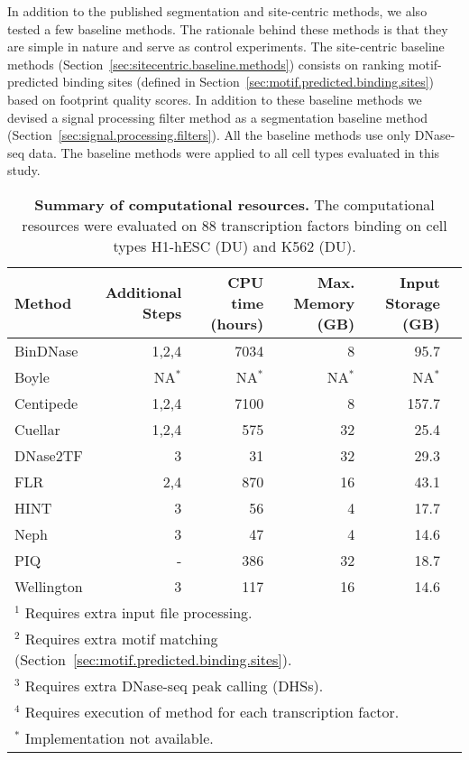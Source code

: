 In addition to the published segmentation and site-centric methods, we also tested a few baseline methods. The rationale behind these methods is that they are simple in nature and serve as control experiments. The site-centric baseline methods (Section~\ref{sec:sitecentric.baseline.methods}) consists on ranking motif-predicted binding sites (defined in Section~\ref{sec:motif.predicted.binding.sites}) based on footprint quality scores. In addition to these baseline methods we devised a signal processing filter method as a segmentation baseline method (Section~\ref{sec:signal.processing.filters}). All the baseline methods use only DNase-seq data. The baseline methods were applied to all cell types evaluated in this study.

\begin{table}[h]
\begin{center}
\caption[Summary of computational resources]{\textbf{Summary of computational resources.} The computational resources were evaluated on 88 transcription factors binding on cell types H1-hESC (DU) and K562 (DU).} 
\label{tab:comp.resource}
\renewcommand{\arraystretch}{1.2}
\begin{tabularx}{\textwidth}{ lrrrrr }
\hline
Method & Additional Steps & CPU time (hours) & Max. Memory (GB) & Input Storage (GB) \\
\hline
BinDNase & 1,2,4 & 7034 & 8 & 95.7 \\
Boyle & NA$^*$ & NA$^*$ & NA$^*$ & NA$^*$ \\
Centipede & 1,2,4 & 7100 & 8 & 157.7 \\
Cuellar & 1,2,4 & 575 & 32 & 25.4 \\
DNase2TF & 3 & 31 & 32 & 29.3 \\
FLR & 2,4 & 870 & 16 & 43.1 \\
HINT & 3 & 56 & 4 & 17.7 \\
Neph & 3 & 47 & 4 & 14.6 \\
PIQ & - & 386 & 32 & 18.7 \\
Wellington & 3 & 117 & 16 & 14.6 \\
\hline
\multicolumn{6}{l}{$^1$ Requires extra input file processing.} \\
\multicolumn{6}{l}{$^2$ Requires extra motif matching (Section~\ref{sec:motif.predicted.binding.sites}).} \\
\multicolumn{6}{l}{$^3$ Requires extra DNase-seq peak calling (DHSs).} \\
\multicolumn{6}{l}{$^4$ Requires execution of method for each transcription factor.} \\
\multicolumn{6}{l}{$^*$ Implementation not available.} \\
\end{tabularx}
\end{center}
\end{table}

